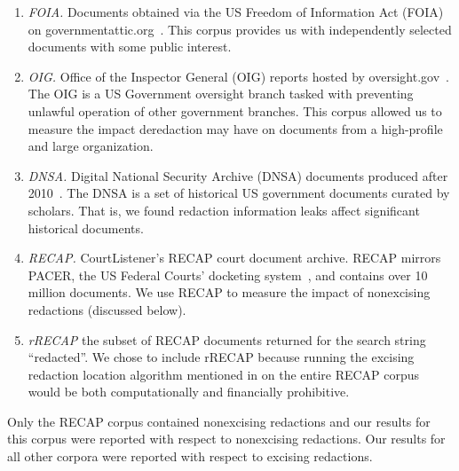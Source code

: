 \begin{enumerate}
    \item \emph{FOIA.} Documents obtained via the US Freedom of Information Act (FOIA) on governmentattic.org~\cite{govattic}. 
This corpus provides us with independently selected documents with some public interest.
    \item \emph{OIG.} Office of the Inspector General (OIG) reports hosted by oversight.gov~\cite{oigReports}. 
The OIG is a US Government oversight branch tasked with preventing unlawful operation of other government branches.
This corpus allowed us to measure the impact deredaction may have on documents from a high-profile and large organization.
    \item \emph{DNSA.} Digital National Security Archive (DNSA) documents produced after 2010~\cite{dnsaSite}. 
The DNSA is a set of historical US government documents curated by scholars. 
That is, we found redaction information leaks affect significant historical documents.
    \item \emph{RECAP.} CourtListener's RECAP court document archive.
RECAP mirrors PACER, the US Federal Courts' docketing system~\cite{pacerSite}, and contains over 10 million documents.
We use RECAP to measure the impact of nonexcising redactions (discussed below).
    \item \emph{rRECAP} the subset of RECAP documents returned for the search string ``redacted''.
We chose to include rRECAP because running the excising redaction location algorithm mentioned in on the entire RECAP corpus would be both computationally and financially prohibitive.
\end{enumerate}

Only the RECAP corpus contained nonexcising redactions and our results for this corpus were reported with respect to nonexcising redactions.
Our results for all other corpora were reported with respect to excising redactions.

